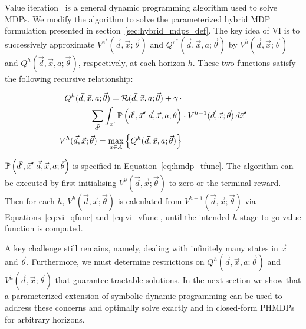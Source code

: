 Value iteration~\parencite{Bellman_PU_1957} is a general dynamic
programming algorithm used to solve MDPs. We modify the algorithm to
solve the parameterized hybrid MDP formulation presented in
section~\ref{sec:hybrid_mdps_def}. The key idea of VI is to
successively approximate {\footnotesize $V^{\pi^{*}}(\vec{d}, \vec{x};
  \vec{\theta})$} and {\footnotesize $Q^{\pi^{*}}(\vec{d}, \vec{x}, a;
  \vec{\theta})$} by {\footnotesize $V^{h}(\vec{d}, \vec{x}; \vec{\theta})$} and
{\footnotesize $Q^{h}(\vec{d}, \vec{x}, a; \vec{\theta})$}, respectively, at
each horizon {\footnotesize$h$}. These two functions satisfy the
following recursive relationship:

{\footnotesize 
    \abovedisplayskip=0pt
    \belowdisplayskip=0pt
    \begin{align}
        Q^{h}(\vec{d}, \vec{x}, a; \vec{\theta}) = \mathcal{R}(\vec{d}, \vec{x}, a; \vec{\theta}) + \gamma \, \cdot &  \nonumber \\ 
        \sum_{\vec{d}'} \int_{\vec{x}'} \mathbb{P}\left({\vec{d}', \vec{x}' | \vec{d}, \vec{x}, a; \vec{\theta}}\right) & \cdot V^{h-1}(\vec{d}, \vec{x}; \vec{\theta}) \, d\vec{x}'  \label{eq:vi_qfunc} \\
        V^{h}(\vec{d}, \vec{x}; \vec{\theta}) = \max_{a \in A} \left\{ Q^{h}(\vec{d}, \vec{x}, a; \vec{\theta}) \right\} & \label{eq:vi_vfunc}
    \end{align}
}%

{\footnotesize $\mathbb{P}\left({\vec{d}', \vec{x}' | \vec{d}, \vec{x}, a;
    \vec{\theta}}\right)$ } is specified in Equation~\eqref{eq:hmdp_tfunc}. The
algorithm can be executed by first initialising {\footnotesize
  $V^{0}(\vec{d}, \vec{x}; \vec{\theta})$} to zero or the terminal
reward. Then for each {\footnotesize$h$}, {\footnotesize
  $V^{h}(\vec{d}, \vec{x}; \vec{\theta})$} is calculated from {\footnotesize
  $V^{h-1}(\vec{d}, \vec{x}; \vec{\theta})$} via
Equations~\eqref{eq:vi_qfunc} and~\eqref{eq:vi_vfunc}, until the
intended $h$-stage-to-go value function is computed.

A key challenge still remains, namely, dealing with infinitely many
states in {\footnotesize $\vec{x}$} and {\footnotesize
  $\vec{\theta}$}. Furthermore, we must determine restrictions on
{\footnotesize $Q^{h}(\vec{d}, \vec{x}, a; \vec{\theta})$} and
{\footnotesize $V^{h}(\vec{d}, \vec{x}; \vec{\theta})$} that guarantee
tractable solutions. In the next section we show that a parameterized
extension of symbolic dynamic programming can be used to address these
concerns and optimally solve exactly and in closed-form PHMDPs for
arbitrary horizons.
